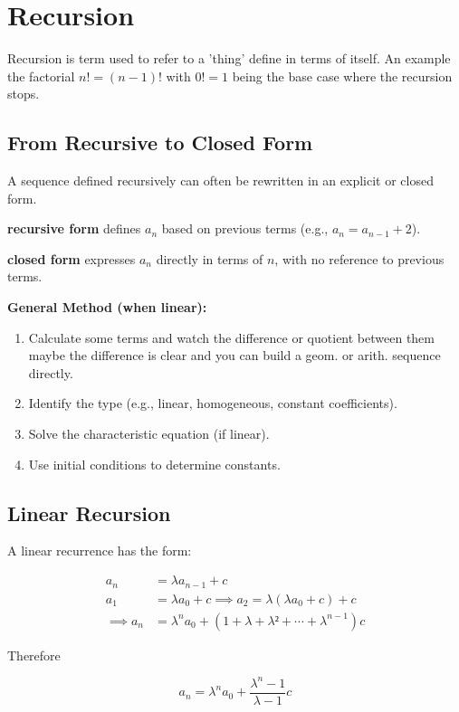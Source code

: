\section{Recursion}

Recursion is term used to refer to a 'thing' define in terms
of itself. An example the factorial \(n! = (n - 1)!\) with \(0! = 1\) being the
base case where the recursion stops.

\subsection{From Recursive to Closed Form}

A sequence defined recursively can often be rewritten in an explicit or closed form.

\textbf{recursive form} defines \( a_n \) based on previous terms (e.g., \( a_n = a_{n-1} + 2 \)).

\textbf{closed form} expresses \( a_n \) directly in terms of \( n \), with no reference to previous terms.

\textbf{General Method (when linear):}
\begin{enumerate}
    \item Calculate some terms and watch the difference or quotient between them
    maybe the difference is clear and you can build a geom. or arith. sequence directly.
    \item Identify the type (e.g., linear, homogeneous, constant coefficients).
    \item Solve the characteristic equation (if linear).
    \item Use initial conditions to determine constants.
\end{enumerate}

\subsection{Linear Recursion}

A linear recurrence has the form:

\begin{align*}
a_n & = \lambda a_{n -1} + c \\
a_1 & = \lambda a_0 + c \implies a_2 = \lambda (\lambda a_0 + c) + c \\
\implies a_n & = \lambda^n a_0 + (1 + \lambda + \lambda² + \cdots + \lambda^{n - 1})c
\end{align*}

Therefore

\[a_n = \lambda^n a_0 + \frac{\lambda^n - 1}{\lambda - 1}c\]

